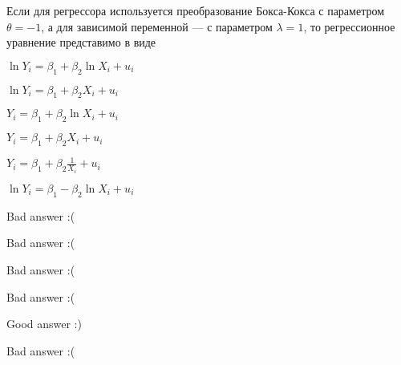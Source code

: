 
\begin{question}
Если для регрессора используется преобразование Бокса-Кокса с параметром \(\theta=-1\),
а для зависимой переменной --- с параметром \(\lambda = 1\),
то регрессионное уравнение представимо в виде
\begin{answerlist}
  \item \(\ln Y_i = \beta_1 + \beta_2 \ln X_i + u_i\)
  \item \(\ln Y_i = \beta_1 + \beta_2 X_i + u_i\)
  \item \(Y_i = \beta_1 + \beta_2 \ln X_i + u_i\)
  \item \(Y_i = \beta_1 + \beta_2 X_i + u_i\)
  \item \(Y_i = \beta_1 + \beta_2 \frac{1}{X_i} + u_i\)
  \item \(\ln Y_i = \beta_1 - \beta_2 \ln X_i + u_i\)
\end{answerlist}
\end{question}

\begin{solution}
\begin{answerlist}
  \item Bad answer :(
  \item Bad answer :(
  \item Bad answer :(
  \item Bad answer :(
  \item Good answer :)
  \item Bad answer :(
\end{answerlist}
\end{solution}

